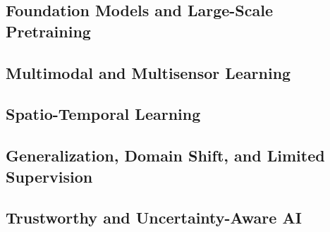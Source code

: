 \documentclass[
    11pt,
    a4paper,
    parskip=half,
    bibliography=totoc,
    numbers=noenddot
]{scrartcl}
\begin{document}
\subsection{Foundation Models and Large-Scale Pretraining}


\subsection{Multimodal and Multisensor Learning}


\subsection{Spatio-Temporal Learning}


\subsection{Generalization, Domain Shift, and Limited Supervision}


\subsection{Trustworthy and Uncertainty-Aware AI}

\end{document}
